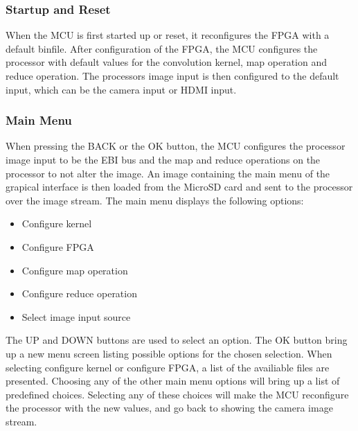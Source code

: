 \subsubsection{Startup and Reset}
When the MCU is first started up or reset, it reconfigures the FPGA with a default binfile. After configuration of the FPGA, the MCU configures the processor with default values for the convolution kernel, map operation and reduce operation. The processors image input is then configured to the default input, which can be the camera input or HDMI input.

\subsubsection{Main Menu}
When pressing the BACK or the OK button, the MCU configures the processor image input to be the EBI bus and the map and reduce operations on the processor to not alter the image. An image containing the main menu of the grapical interface is then loaded from the MicroSD card and sent to the processor over the image stream. The main menu displays the following options:

\begin{itemize}
	\item Configure kernel
	\item Configure FPGA
	\item Configure map operation
	\item Configure reduce operation
	\item Select image input source
\end{itemize}

The UP and DOWN buttons are used to select an option. The OK button bring up a new menu screen listing possible options for the chosen selection. When selecting configure kernel or configure FPGA, a list of the availiable files are presented. Choosing any of the other main menu options will bring up a list of predefined choices. Selecting any of these choices will make the MCU reconfigure the processor with the new values, and go back to showing the camera image stream.


